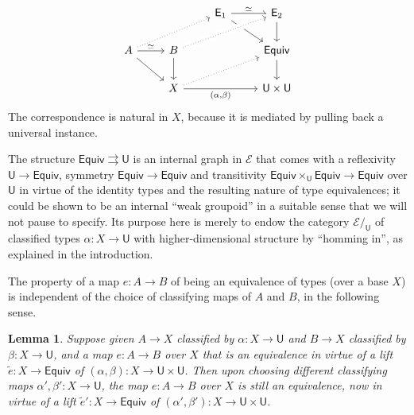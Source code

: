 \documentclass[12pt,reqno]{amsart}
\newcommand{\EE}{\ensuremath{\mathcal{E}}}
\renewcommand{\to}{\ensuremath{\rightarrow}}
\newcommand{\tto}{\ensuremath{\rightrightarrows}}
\newcommand{\T}{\ensuremath{\mathsf{U}}}
\newtheorem{lemma}[theorem]{Lemma}
\theoremstyle{remark}
\theoremstyle{definition}
\begin{document}
\begin{equation}\label{diag:univalence3}
\begin{tikzcd} 
	&& \mathsf{E}_1 \ar[rd]  \ar[r,"{\simeq}"]  & \mathsf{E}_2 \ar[d] \\  
A \ar[rd] \ar[r, "{\simeq}"] \ar[rru, dotted] & B \ar[d] \ar[rru, crossing over, dotted] && \mathsf{Equiv} \ar[d] \\  
& X \ar[rru, dotted] \ar[rr, swap, "{(\alpha, \beta)}"] && \T \times \T
	 \end{tikzcd}
 \end{equation}
The correspondence is natural in $X$, because it is mediated by pulling back a universal instance.  

The structure $\mathsf{Equiv} \tto \T $ is an internal graph in $\EE$ that comes with a reflexivity $\T \to \mathsf{Equiv}$, symmetry $\mathsf{Equiv} \to \mathsf{Equiv}$ and transitivity $\mathsf{Equiv}\times_\T \mathsf{Equiv} \to \mathsf{Equiv}$ over $\T$ in virtue of the identity types and the resulting nature of type equivalences; it could be shown to be an internal ``weak groupoid'' in a suitable sense that we will not pause to specify.  Its purpose here is merely to endow the category $\EE/_\T$ of classified types $\alpha : X \to \T$ with higher-dimensional structure by ``homming in'', as explained in the introduction. 

The property of a map $e : A \to B$ of being an equivalence of types (over a base $X$) is independent of the choice of classifying maps of $A$ and $B$, in the following sense.
\begin{lemma}\label{lemma:equivinvariance}
Suppose given $A\to X$ classified by $\alpha: X \to \T$ and $B \to X$ classified by $\beta: X \to \T$, and a map $e : A \to B$ over $X$ that is an equivalence in virtue of a lift $\tilde{e} : X \to  \mathsf{Equiv}$ of $(\alpha, \beta) : X \to \T\times \T$.   Then upon choosing different classifying maps $\alpha', \beta' : X \to \T$, the map $e : A \to B$ over $X$ is still an equivalence, now in virtue of a lift ${\tilde{e}}' : X \to \mathsf{Equiv}$ of $(\alpha', \beta') : X \to \T\times \T$.
\end{lemma}
\end{document}
